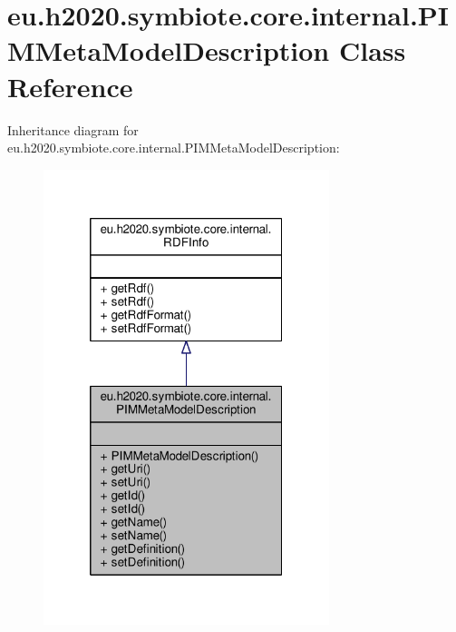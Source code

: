 \hypertarget{classeu_1_1h2020_1_1symbiote_1_1core_1_1internal_1_1PIMMetaModelDescription}{}\section{eu.\+h2020.\+symbiote.\+core.\+internal.\+P\+I\+M\+Meta\+Model\+Description Class Reference}
\label{classeu_1_1h2020_1_1symbiote_1_1core_1_1internal_1_1PIMMetaModelDescription}


Inheritance diagram for eu.\+h2020.\+symbiote.\+core.\+internal.\+P\+I\+M\+Meta\+Model\+Description\+:
\nopagebreak
\begin{figure}[H]
\begin{center}
\leavevmode
\includegraphics[width=236pt]{classeu_1_1h2020_1_1symbiote_1_1core_1_1internal_1_1PIMMetaModelDescription__inherit__graph}
\end{center}
\end{figure}


